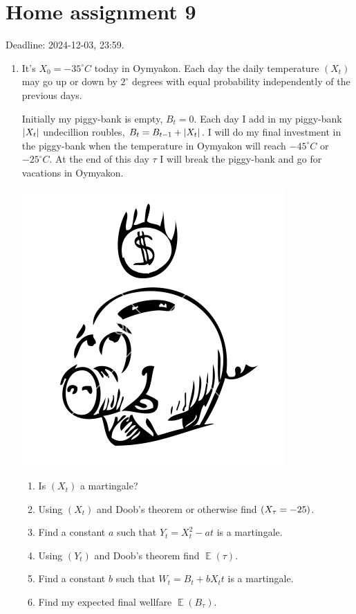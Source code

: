 \documentclass[12pt]{article}
\let\P\relax
\DeclareMathOperator{\P}{\mathbb{P}}
\DeclareMathOperator{\E}{\mathbb{E}}
\DeclarePairedDelimiter{\abs}{\lvert}{\rvert}
\begin{document}
\section*{Home assignment 9}

Deadline: 2024-12-03, 23:59.


\begin{enumerate}
    \item It's $X_0 = -35^{\circ}C$ today in Oymyakon. 
    Each day the daily temperature $(X_t)$ may go up or down by $2^{\circ}$ degrees with equal probability independently of the previous days. 
 
    Initially my piggy-bank is empty, $B_t = 0$. 
    Each day I add in my piggy-bank $\abs{X_t}$ undecillion roubles, $B_{t} = B_{t-1} + \abs{X_t}$.
    I will do my final investment in the piggy-bank when the temperature in Oymyakon will reach $-45^{\circ}C$ or $-25^{\circ}C$.
    At the end of this day $\tau$ I will break the piggy-bank and go for vacations in Oymyakon. 

    \begin{minipage}{0.9\textwidth}
        \includegraphics[scale=0.35]{figures/piggy.png}        
    \end{minipage}


    \begin{enumerate}
        \item Is $(X_t)$ a martingale?
        \item Using $(X_t)$ and Doob's theorem or otherwise find $\P(X_{\tau} = -25)$.
        \item Find a constant $a$ such that $Y_t = X^2_t - a t$ is a martingale.
        \item Using $(Y_t)$ and Doob's theorem find $\E(\tau)$.
        \item Find a constant $b$ such that $W_t = B_t + b X_t t$ is a martingale. 
        \item Find my expected final wellfare $\E(B_{\tau})$.
    \end{enumerate}


\end{enumerate}
\end{document}
